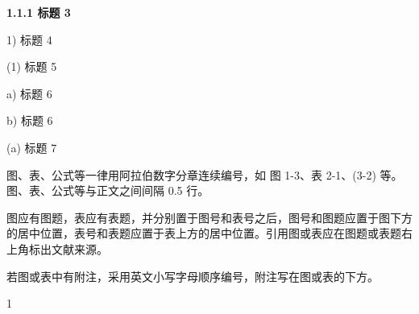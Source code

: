 \documentclass[UTF8, scheme=chinese, openany, oneside]{ctexbook}
\begin{document}


\vspace{0.5em}

\noindent\hspace*{0.5em} {\bfseries 1.1.1 \quad 标题 3}

\vspace{0.5em}

\noindent\hspace*{1.0em} { 1) \quad 标题 4}

\vspace{0.5em}

\noindent\hspace*{1.5em} { (1) \quad 标题 5}

\vspace{0.5em}

\noindent\hspace*{2em} { a) \quad 标题 6}

\vspace{0.5em}

\noindent\hspace*{2em} { b) \quad 标题 6}

\vspace{0.5em}

\noindent\hspace*{2.5em} { (a) \quad 标题 7}


\vspace{2em}

\noindent\hspace{2em}图、表、公式等一律用阿拉伯数字分章连续编号，如 图 1-3、表 2-1、(3-2) 等。图、表、公式等与正文之间间隔 0.5 行。

\noindent\hspace{2em}图应有图题，表应有表题，并分别置于图号和表号之后，图号和图题应置于图下方的居中位置，表号和表题应置于表上方的居中位置。引用图或表应在图题或表题右上角标出文献来源。

\noindent\hspace{2em}若图或表中有附注，采用英文小写字母顺序编号，附注写在图或表的下方。

\vfill
\begin{flushright} 1 \end{flushright}
\clearpage
\end{document}
